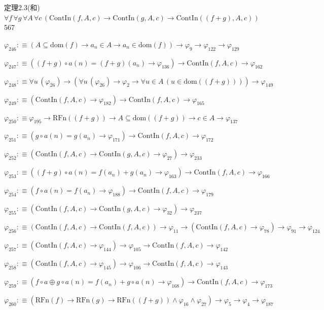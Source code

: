 \begin{fullproof}{定理2.3(和)}{$\forall f\,\forall g\,\forall A\,\forall c\,(\mathrm{ContIn}(f,A,c) \to \mathrm{ContIn}(g,A,c) \to \mathrm{ContIn}((f + g),A,c))$}{567}
\begin{abbrevlist}
\item $\varphi_{246} :\equiv (A \subseteq \mathrm{dom}(f) \to a_{n} \in A \to a_{n} \in \mathrm{dom}(f)) \to \varphi_{9} \to \varphi_{122} \to \varphi_{129}$
\item $\varphi_{247} :\equiv ((f + g) \circ a(n) = (f + g)(a_{n}) \to \varphi_{136}) \to \mathrm{ContIn}(f,A,c) \to \varphi_{162}$
\item $\varphi_{248} :\equiv \forall u\,(\varphi_{26}) \to (\forall u\,(\varphi_{26}) \to \varphi_{2} \to \forall u \in A\,(u \in \mathrm{dom}((f + g)))) \to \varphi_{149}$
\item $\varphi_{249} :\equiv (\mathrm{ContIn}(f,A,c) \to \varphi_{182}) \to \mathrm{ContIn}(f,A,c) \to \varphi_{165}$
\item $\varphi_{250} :\equiv \varphi_{195} \to \mathrm{RFn}((f + g)) \to A \subseteq \mathrm{dom}((f + g)) \to c \in A \to \varphi_{137}$
\item $\varphi_{251} :\equiv (g \circ a(n) = g(a_{n}) \to \varphi_{171}) \to \mathrm{ContIn}(f,A,c) \to \varphi_{172}$
\item $\varphi_{252} :\equiv (\mathrm{ContIn}(f,A,c) \to \mathrm{ContIn}(g,A,c) \to \varphi_{27}) \to \varphi_{233}$
\item $\varphi_{253} :\equiv ((f + g) \circ a(n) = f(a_{n}) + g(a_{n}) \to \varphi_{163}) \to \mathrm{ContIn}(f,A,c) \to \varphi_{166}$
\item $\varphi_{254} :\equiv (f \circ a(n) = f(a_{n}) \to \varphi_{188}) \to \mathrm{ContIn}(f,A,c) \to \varphi_{179}$
\item $\varphi_{255} :\equiv (\mathrm{ContIn}(f,A,c) \to \mathrm{ContIn}(g,A,c) \to \varphi_{32}) \to \varphi_{237}$
\item $\varphi_{256} :\equiv (\mathrm{ContIn}(f,A,c) \to \mathrm{ContIn}(f,A,c)) \to \varphi_{11} \to (\mathrm{ContIn}(f,A,c) \to \varphi_{78}) \to \varphi_{91} \to \varphi_{124}$
\item $\varphi_{257} :\equiv (\mathrm{ContIn}(f,A,c) \to \varphi_{144}) \to \varphi_{105} \to \mathrm{ContIn}(f,A,c) \to \varphi_{142}$
\item $\varphi_{258} :\equiv (\mathrm{ContIn}(f,A,c) \to \varphi_{145}) \to \varphi_{106} \to \mathrm{ContIn}(f,A,c) \to \varphi_{143}$
\item $\varphi_{259} :\equiv (f \circ a \oplus g \circ a(n) = f(a_{n}) + g \circ a(n) \to \varphi_{168}) \to \mathrm{ContIn}(f,A,c) \to \varphi_{173}$
\item $\varphi_{260} :\equiv (\mathrm{RFn}(f) \to \mathrm{RFn}(g) \to \mathrm{RFn}((f + g)) \land \varphi_{16} \land \varphi_{27}) \to \varphi_{5} \to \varphi_{4} \to \varphi_{187}$

\end{abbrevlist}
\end{fullproof}

